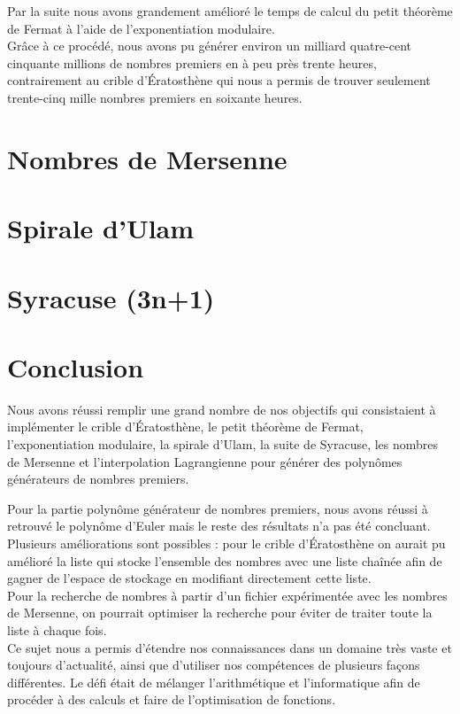 \documentclass[a4paper,12pt]{article} %
\begin{document}
Par la suite nous avons grandement amélioré le temps de calcul du petit théorème de Fermat à l'aide de l'exponentiation modulaire.\\

Grâce à ce procédé, nous avons pu générer environ un milliard quatre-cent cinquante millions de nombres premiers en à peu près trente heures, contrairement au crible d’Ératosthène qui nous a permis de trouver seulement trente-cinq mille nombres premiers en soixante heures.

\section{Nombres de Mersenne}


\section{Spirale d'Ulam}


\section{Syracuse (3n+1)}


\section*{Conclusion}

Nous avons réussi remplir une grand nombre de nos objectifs qui consistaient à implémenter le crible d’Ératosthène, le petit théorème de Fermat, l'exponentiation modulaire, la spirale d'Ulam, la suite de Syracuse, les nombres de Mersenne et l'interpolation Lagrangienne pour générer des polynômes générateurs de nombres premiers.

Pour la partie polynôme générateur de nombres premiers, nous avons réussi à retrouvé le polynôme d'Euler mais le reste des résultats n'a pas été concluant.\\

Plusieurs améliorations sont possibles : pour le crible d’Ératosthène on aurait pu amélioré la liste qui stocke l'ensemble des nombres avec une liste chaînée afin de gagner de l'espace de stockage en modifiant directement cette liste.\\
Pour la recherche de nombres à partir d'un fichier expérimentée avec les nombres de Mersenne, on pourrait optimiser la recherche pour éviter de traiter toute la liste à chaque fois.\\

Ce sujet nous a permis d'étendre nos connaissances dans un domaine très vaste et toujours d'actualité, ainsi que d'utiliser nos compétences de plusieurs façons différentes. Le défi était de mélanger l'arithmétique et l'informatique afin de procéder à des calculs et faire de l'optimisation de fonctions.
\end{document}

